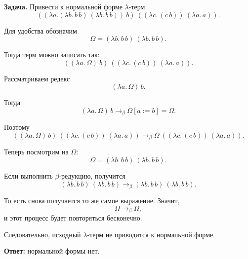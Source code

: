\documentclass[12pt,a4paper]{article}
\begin{document}
\textbf{Задача.} Привести к нормальной форме $\lambda$-терм
\[
((\lambda a.(\lambda b.\, b\, b)\ (\lambda b.\, b\, b))\ b)\ ((\lambda c.\,(c\, b))\ (\lambda a.\, a)).
\]

Для удобства обозначим
\[
\Omega = (\lambda b.\, b\, b)\ (\lambda b.\, b\, b).
\]

Тогда  терм можно записать так:
\[
((\lambda a.\, \Omega)\ b)\ ((\lambda c.\,(c\, b))\ (\lambda a.\, a)).
\]

Рассматриваем редекс
\[
(\lambda a.\,\Omega)\,b.
\]

Тогда
\[
(\lambda a.\,\Omega)\,b \to_\beta \Omega[a:=b]=\Omega.
\]

Поэтому
\[
((\lambda a.\,\Omega)\,b)\ ((\lambda c.\,(c\, b))\ (\lambda a.\, a))
\to_\beta
\Omega\ ((\lambda c.\,(c\, b))\ (\lambda a.\, a)).
\]

Теперь посмотрим на $\Omega$:
\[
\Omega = (\lambda b.\, b\, b)\ (\lambda b.\, b\, b).
\]

Если выполнить $\beta$-редукцию, получится
\[
(\lambda b.\, b\, b)\ (\lambda b.\, b\, b)
\to_\beta
(\lambda b.\, b\, b)\ (\lambda b.\, b\, b).
\]

То есть снова получается то же самое выражение. Значит,
\[
\Omega \to_\beta \Omega,
\]
и этот процесс будет повторяться бесконечно.


Следовательно, исходный $\lambda$-терм не приводится к нормальной форме.

\textbf{Ответ:} нормальной формы нет.
\end{document}
